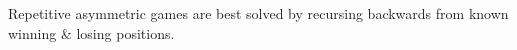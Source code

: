 \categorycontents{}


Repetitive asymmetric games are best solved by recursing backwards from
known winning \& losing positions.


\begin{sourceslandscape}
\end{sourceslandscape}
